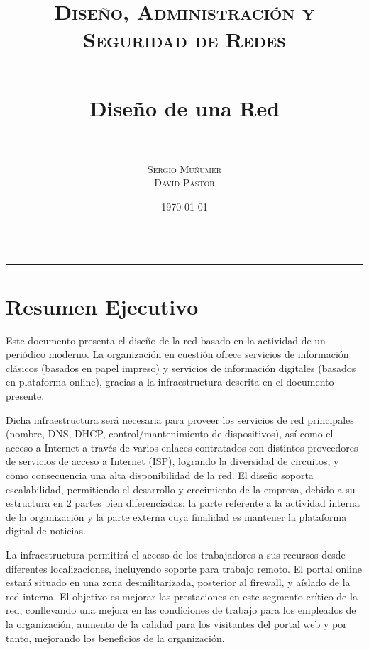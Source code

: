 \documentclass[a4paper,onecolumn,11pt]{article}
\title{
\textsc{\normalsize Diseño, Administración y Seguridad de Redes} \\
\vspace{1cm}
\hrule
\vspace{0.4cm}
Diseño de una Red %
\vspace{0.5cm}
\hrule
}
\author{ \textsc{Sergio Muñumer} \\  \textsc{David Pastor} } %
\date{\today} %
\begin{document}
\maketitle %


\hrule

\tableofcontents %

\listoffigures %


\listoftables %

\hrule






\section{Resumen Ejecutivo}

Este documento presenta el diseño de la red basado en la actividad de un periódico moderno. La organización en cuestión ofrece servicios de información 
clásicos (basados en papel impreso) y servicios de información digitales (basados en plataforma online), gracias a la infraestructura descrita 
en el documento presente.

Dicha infraestructura será necesaria para proveer los servicios de red principales (nombre, DNS, DHCP, control/mantenimiento de dispositivos), así como el acceso a Internet a través de varios enlaces contratados con distintos proveedores 
de servicios de acceso a Internet (ISP), logrando la diversidad de circuitos, y como consecuencia una alta disponibilidad de la red. El diseño soporta escalabilidad, permitiendo el desarrollo y crecimiento de la empresa, debido a su estructura en 2 partes bien 
diferenciadas: la parte referente a la actividad interna de la organización y la parte externa cuya finalidad es mantener la plataforma 
digital de noticias.

La infraestructura permitirá el acceso de los trabajadores a sus recursos desde diferentes localizaciones, incluyendo soporte para trabajo remoto. El portal online estará situado en una zona desmilitarizada, posterior al firewall, y aíslado de la red interna. El objetivo es mejorar las prestaciones en este segmento crítico de la red, conllevando una mejora en las condiciones de trabajo para los empleados de la organización, aumento de la calidad para los visitantes del portal web y por tanto, mejorando los beneficios de la organización.
\end{document}
